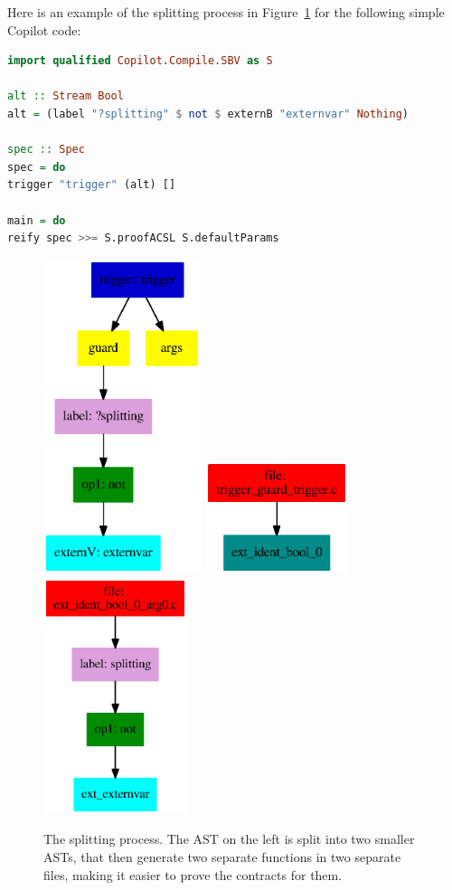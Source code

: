 Here is an example of the splitting process in Figure~\ref{fig:splitting label}
for the following simple Copilot code:
\begin{lstlisting}[language=Haskell]
import qualified Copilot.Compile.SBV as S

alt :: Stream Bool
alt = (label "?splitting" $ not $ externB "externvar" Nothing)

spec :: Spec
spec = do
trigger "trigger" (alt) []

main = do
reify spec >>= S.proofACSL S.defaultParams
\end{lstlisting}

\begin{figure}[!htb]
      \vspace{3em}
      \includegraphics[width=46mm]{images/label/main.ps}
      \centering
      \includegraphics[width=42mm]{images/label/splitted.ps}
      \includegraphics[width=42mm]{images/label/splitted2.ps}
      \caption{The splitting process. The AST on the left is split into two
      smaller ASTs, that then generate two separate functions in two separate
      files, making it easier to prove the contracts for them.}
      \label{fig:splitting label}
\end{figure}
